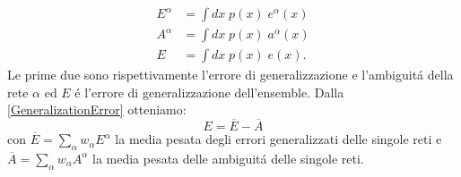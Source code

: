 \documentclass[a4paper,12pt]{report}
\begin{document}
  \begin{align}
   E^{\alpha} &= \int dx \; p\left(x\right) \; e^{\alpha}\left(x\right) \\
   A^{\alpha} &= \int dx \; p\left(x\right) \; a^{\alpha}\left(x\right) \\
   E &= \int dx \; p\left(x\right) \; e\left(x\right).
  \end{align}
  Le prime due sono rispettivamente l'errore di generalizzazione e l'ambiguit\'a della rete $\alpha$ ed $E$ \'e l'errore di generalizzazione dell'ensemble. 
  Dalla \ref{GeneralizationError} otteniamo:
  \begin{equation}
   E = \overline{E} - \overline{A} \label{EnsembleGeneralizationError}
  \end{equation}
  con $\overline{E} = \sum_{\alpha} w_{\alpha} E^{\alpha}$ la media pesata degli errori generalizzati delle singole reti e $\overline{A} = \sum_{\alpha} w_{\alpha} A^{\alpha}$ la media pesata delle ambiguit\'a delle singole reti.
  
\end{document}
